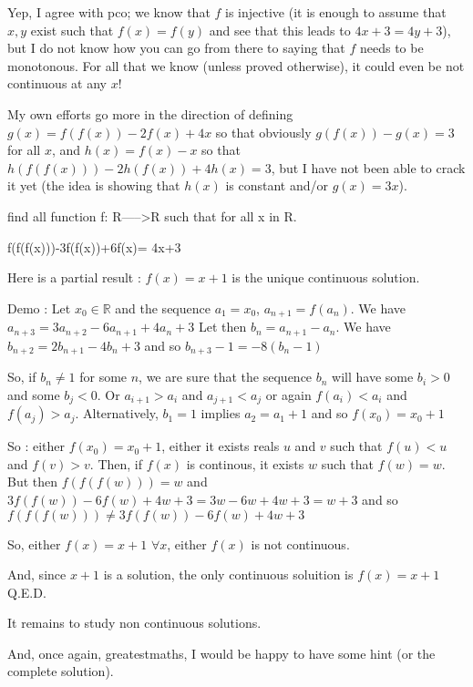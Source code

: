 \begin{mysolution}

Yep, I agree with pco; we know that $ f$ is injective (it is enough to assume that $ x,y$ exist such that $ f(x) = f(y)$ and see that this leads to $ 4x+3 = 4y+3$), but I do not know how you can go from there to saying that $ f$ needs to be monotonous.  For all that we know (unless proved otherwise), it could even be not continuous at any $ x$!

My own efforts go more in the direction of defining $ g(x) = f(f(x))-2f(x)+4x$ so that obviously $ g(f(x))-g(x) = 3$ for all $ x$, and $ h(x) = f(x)-x$ so that $ h(f(f(x)))-2h(f(x))+4h(x) = 3$, but I have not been able to crack it yet (the idea is showing that $ h(x)$ is constant and/or $ g(x) = 3x$).
\end{mysolution}



\begin{mysolution}
	\begin{tcolorbox}find all function f: R----->R such that for all x in R. 

f(f(f(x)))-3f(f(x))+6f(x)= 4x+3\end{tcolorbox}

Here is a partial result : $ f(x) = x+1$ is the unique continuous solution.

Demo :
Let $ x_{0}\in\mathbb{R}$ and the sequence $ a_{1}= x_{0}$, $ a_{n+1}= f(a_{n})$.
We have $ a_{n+3}= 3a_{n+2}-6a_{n+1}+4a_{n}+3$
Let then $ b_{n}= a_{n+1}-a_{n}$. We have $ b_{n+2}= 2b_{n+1}-4b_{n}+3$ and so $ b_{n+3}-1 =-8(b_{n}-1)$

So, if $ b_{n}\neq 1$ for some $ n$, we are sure that the sequence $ b_{n}$ will have some $ b_{i}> 0$ and some $ b_{j}< 0$. Or $ a_{i+1}> a_{i}$ and $ a_{j+1}< a_{j}$ or again $ f(a_{i}) < a_{i}$ and $ f(a_{j}) > a_{j}$. 
Alternatively, $ b_{1}= 1$ implies $ a_{2}= a_{1}+1$ and so $ f(x_{0}) = x_{0}+1$

So : either $ f(x_{0}) = x_{0}+1$, either it exists reals $ u$ and $ v$ such that $ f(u) < u$ and $ f(v) > v$. Then, if $ f(x)$ is continous, it exists $ w$ such that $ f(w) = w$. But then $ f(f(f(w))) = w$ and $ 3f(f(w))-6f(w)+4w+3 = 3w-6w+4w+3 = w+3$ and so $ f(f(f(w)))\neq 3f(f(w))-6f(w)+4w+3$

So, either $ f(x) = x+1$ $ \forall x$, either $ f(x)$ is not continuous.

And, since $ x+1$ is a solution, the only continuous soluition is $ f(x) = x+1$
Q.E.D.

It remains to study non continuous solutions.

And, once again, greatestmaths, I would be happy to have some hint (or the complete solution).
\end{mysolution}


